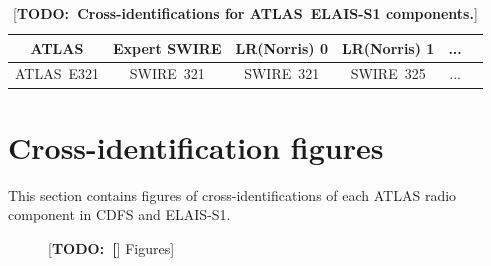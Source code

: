 \documentclass[fleqn,usenatbib,usedcolumn]{mnras}
\newcommand{\todo}[1]{ {\color{red}[{\bf TODO:~{#1}}]} }
\begin{document}
  \begin{table}
    \caption{\todo{Cross-identifications for ATLAS~ELAIS-S1 components.}}
    \label{tab:elais-xids}
    \begin{tabular}{cccccc}
      \hline
      ATLAS & Expert SWIRE & LR(Norris) 0 & LR(Norris) 1 & ... \\
      \hline
      ATLAS~E321 & SWIRE~321 & SWIRE~321 & SWIRE~325 & ... \\
      \hline
    \end{tabular}
  \end{table}

\section{Cross-identification figures}\label{app:examples}

    This section contains figures of cross-identifications of each ATLAS radio component in CDFS and ELAIS-S1.

    \begin{figure}
      \caption{\todo[Figures]}
    \end{figure}


\bsp	%
\label{lastpage}
\end{document}

